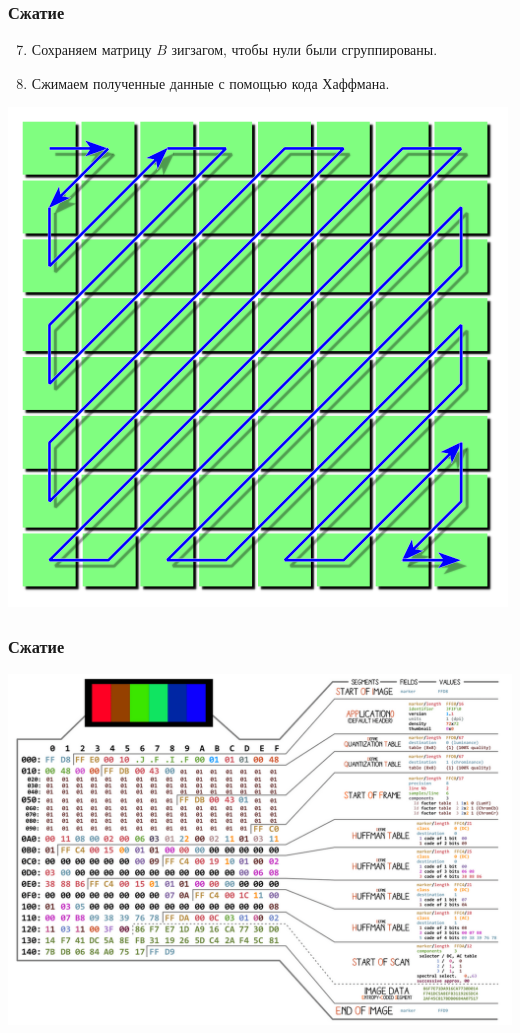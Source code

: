 \documentclass[10pt,pdf,hyperref={unicode}]{beamer}
\begin{document}
\begin{frame}[fragile]
\frametitle{Сжатие} 
\begin{enumerate}
\setcounter{enumi}{6}
\item Сохраняем матрицу $B$ зигзагом, чтобы нули были сгруппированы.
\item Сжимаем полученные данные с помощью кода Хаффмана.
\end{enumerate}
\begin{center}
\includegraphics[scale=0.4]{./images/jpeg_zigzag.png}
\end{center}
\end{frame}


\begin{frame}[fragile]
\frametitle{Сжатие} 
\begin{center}
\includegraphics[scale=0.6]{./images/050.png}
\end{center}
\end{frame}
\end{document}
